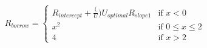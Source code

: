\documentclass[preview]{standalone}
\begin{document}
\begin{align*}
{R_{borrow} = \begin{cases} R_{intercept} + \frac(U){U_{optimal}}R_{slope1} & \text{if } x < 0 \\ x^2 & \text{if } 0 \leq x \leq 2 \\ 4 & \text{if } x > 2 \end{cases}}
\end{align*}
\end{document}
